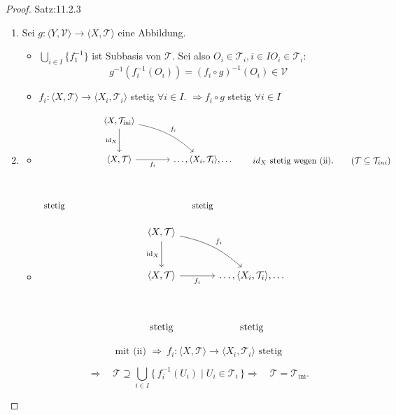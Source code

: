 \begin{proof}{Satz:11.2.3}
    \begin{enumerate}
        \item["(i) $\Rightarrow$ (ii)"] Sei $g: \langle Y, \mathcal{V} \rangle \to \langle X, \mathcal{T} \rangle$ eine Abbildung.
        \begin{itemize}
            \item ["$\Rightarrow$"] $\bigcup_{i \in I}\{f_1^{-1}\}$ ist Subbasis von $\mathcal{T}$.
            Sei also $O_i \in \mathcal{T}_i, i \in I O_i \in \mathcal{T}_i$:
            $$g^{-1}(f_i^{-1}(O_i)) = (f_i \circ g)^{-1}(O_i) \in \mathcal{V}$$
            \item["$\Leftarrow$"] $f_i: \langle X, \mathcal{T} \rangle \to \langle X_i, \mathcal{T}_i \rangle$ stetig $\forall i \in I$.
            $\Rightarrow f_i \circ g$ stetig $\forall i \in I$
        \end{itemize}
    \item["(ii) $\Rightarrow$ (i)"] 
    \begin{itemize}
        \item[(1)]
            $$
            \begin{tikzcd}[column sep=large, row sep=large]
            & \langle X, \mathcal T_{\mathrm{ini}} \rangle 
                \arrow[d, "\mathrm{id}_X"'] 
                \arrow[dr, "f_i", bend left=15] & 
                \\
            & \langle X, \mathcal T \rangle 
                \arrow[r, "f_i"'] 
            & \dots, \langle X_i, \mathcal T_i \rangle, \dots
            \\[1em]
            \text{stetig} & & \text{stetig}
            \end{tikzcd}
            \qquad
            id_X \text{ stetig wegen (ii).}
            \qquad
            (\mathcal T \subseteq \mathcal T_{ini})
            $$
        \item[(2)]
        $$
        \begin{tikzcd}[column sep=large, row sep=large]
        & \langle X, \mathcal T \rangle 
        \arrow[d, "\mathrm{id}_X"'] 
        \arrow[dr, "f_i", bend left=15] & 
        \\
        & \langle X, \mathcal T \rangle 
        \arrow[r, "f_i"'] 
        & \dots, \langle X_i, \mathcal T_i \rangle, \dots
        \\[1em]
        & \text{stetig} & \text{stetig}
        \end{tikzcd}
        $$

        $$
        \text{mit (ii) } \Rightarrow\ 
        f_i : \langle X, \mathcal T \rangle \to \langle X_i, \mathcal T_i \rangle
        \text{ stetig}
        $$

        $$
        \Rightarrow\quad
        \mathcal T \supseteq 
        \bigcup_{i\in I} \{\, f_i^{-1}(U_i) \mid U_i \in \mathcal T_i \,\}
        \Rightarrow\quad
        \mathcal T = \mathcal T_{\mathrm{ini}}.
        $$
    \end{itemize}
\end{enumerate}
\end{proof}

